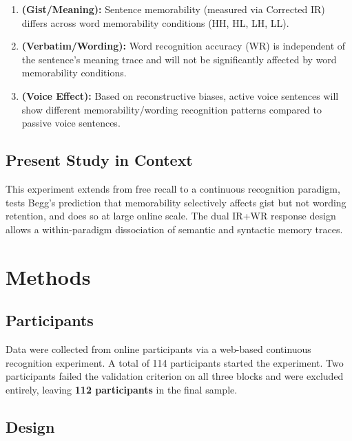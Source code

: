 \documentclass[12pt, a4paper]{article}
\begin{document}
\begin{enumerate}[label=\textbf{H\arabic*:}]
    \item \textbf{(Gist/Meaning):} Sentence memorability (measured via Corrected IR) differs across word memorability conditions (HH, HL, LH, LL).
    \item \textbf{(Verbatim/Wording):} Word recognition accuracy (WR) is independent of the sentence's meaning trace and will not be significantly affected by word memorability conditions.
    \item \textbf{(Voice Effect):} Based on reconstructive biases, active voice sentences will show different memorability/wording recognition patterns compared to passive voice sentences.
\end{enumerate}

\subsection{Present Study in Context}

This experiment extends \citet{james1973} from free recall to a continuous recognition paradigm, tests Begg's prediction that memorability selectively affects gist but not wording retention, and does so at large online scale. The dual IR+WR response design allows a within-paradigm dissociation of semantic and syntactic memory traces.

\section{Methods}

\subsection{Participants}

Data were collected from online participants via a web-based continuous recognition experiment. A total of 114 participants started the experiment. Two participants failed the validation criterion on all three blocks and were excluded entirely, leaving \textbf{112 participants} in the final sample.

\subsection{Design}
\end{document}
